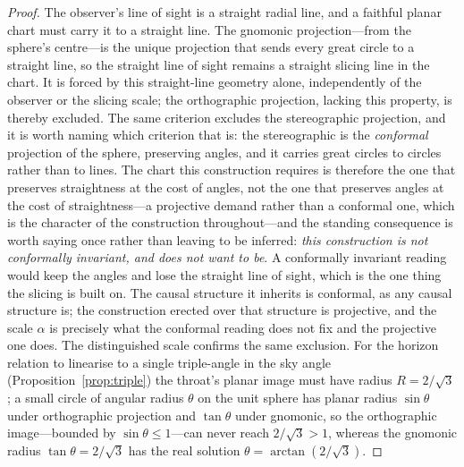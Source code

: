 \documentclass[11pt,a4paper]{article}
\theoremstyle{definition}
\begin{document}
\begin{proof}
The observer's line of sight is a straight radial line, and a faithful planar chart must carry it to a straight line. The gnomonic projection---from the sphere's centre---is the unique projection that sends every great circle to a straight line, so the straight line of sight remains a straight slicing line in the chart. It is forced by this straight-line geometry alone, independently of the observer or the slicing scale; the orthographic projection, lacking this property, is thereby excluded. The same criterion excludes the stereographic projection, and it is worth naming which criterion that is: the stereographic is the \emph{conformal} projection of the sphere, preserving angles, and it carries great circles to circles rather than to lines. The chart this construction requires is therefore the one that preserves straightness at the cost of angles, not the one that preserves angles at the cost of straightness---a projective demand rather than a conformal one, which is the character of the construction throughout---and the standing consequence is worth saying once rather than leaving to be inferred: \emph{this construction is not conformally invariant, and does not want to be}. A conformally invariant reading would keep the angles and lose the straight line of sight, which is the one thing the slicing is built on. The causal structure it inherits is conformal, as any causal structure is; the construction erected over that structure is projective, and the scale $\alpha$ is precisely what the conformal reading does not fix and the projective one does. The distinguished scale confirms the same exclusion. For the horizon relation to linearise to a single triple-angle in the sky angle (Proposition~\ref{prop:triple}) the throat's planar image must have radius $R=2/\sqrt3$; a small circle of angular radius $\theta$ on the unit sphere has planar radius $\sin\theta$ under orthographic projection and $\tan\theta$ under gnomonic, so the orthographic image---bounded by $\sin\theta\le1$---can never reach $2/\sqrt3>1$, whereas the gnomonic radius $\tan\theta=2/\sqrt3$ has the real solution $\theta=\arctan(2/\sqrt3)$.
\end{proof}
\end{document}
